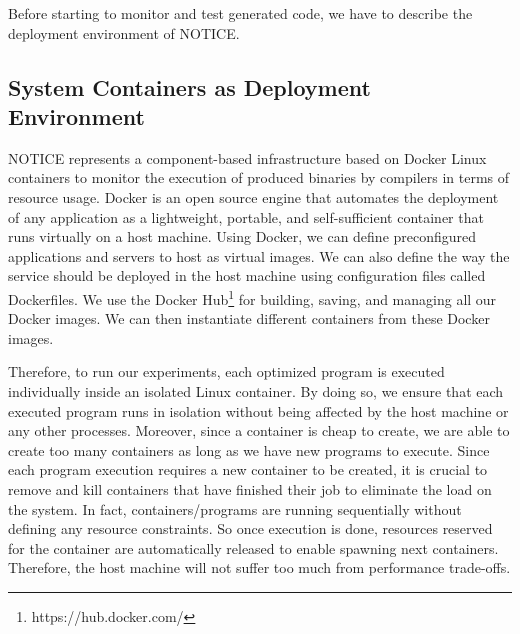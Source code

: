 Before starting to monitor and test generated code, we have to describe the deployment environment of NOTICE.
\subsection{System Containers as Deployment Environment}

NOTICE represents a component-based infrastructure based on Docker Linux containers to monitor the execution of produced binaries by compilers in terms of resource usage. 
Docker is an open source engine that automates the deployment of any application as a lightweight, portable, and self-sufficient container that runs virtually on a host machine. 
Using Docker, we can define preconfigured applications and servers to host as virtual images. We can also define the way the service should be deployed in the host machine using configuration files called Dockerfiles. 
We use the Docker Hub\footnote{https://hub.docker.com/} for building, saving, and managing all our Docker images. 
We can then instantiate different containers from these Docker images. 

Therefore, to run our experiments, each optimized program is executed individually inside an isolated Linux container. By doing so, we ensure that each executed program runs in isolation without being affected by the host machine or any other processes. Moreover, since a container is cheap to create, we are able to create too many containers as long as we have new programs to execute. 
Since each program execution requires a new container to be created, it is crucial to remove and kill containers that have finished their job to eliminate the load on the system. In fact, containers/programs are running sequentially without defining any resource constraints. So once execution is done, resources reserved for the container are automatically released to enable spawning next containers. Therefore, the host machine will not suffer too much from performance trade-offs.

